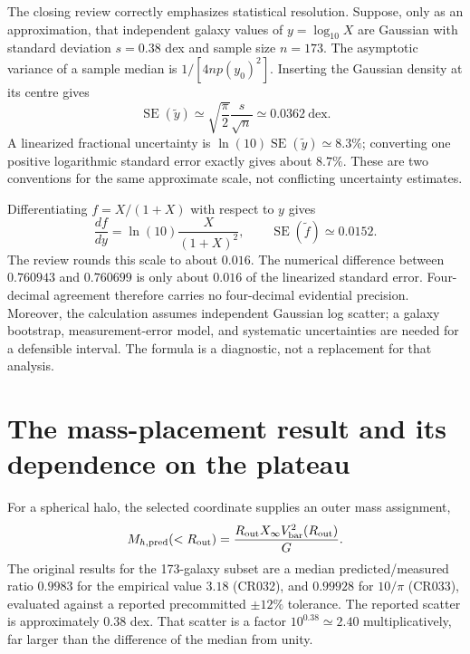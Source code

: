 The closing review correctly emphasizes statistical resolution. Suppose, only as an approximation, that independent galaxy values of $y=\log_{10}X$ are Gaussian with standard deviation $s=0.38$ dex and sample size $n=173$. The asymptotic variance of a sample median is $1/[4n p(y_0)^2]$. Inserting the Gaussian density at its centre gives
\begin{equation}
 \operatorname{SE}(\widetilde y)\simeq
 \sqrt{\frac{\pi}{2}}\frac{s}{\sqrt n}
 \simeq0.0362\ \mathrm{dex}.
 \label{c10:medianerror}
\end{equation}
A linearized fractional uncertainty is $\ln(10)\operatorname{SE}(\widetilde y)\simeq8.3\%$; converting one positive logarithmic standard error exactly gives about $8.7\%$. These are two conventions for the same approximate scale, not conflicting uncertainty estimates.

Differentiating $f=X/(1+X)$ with respect to $y$ gives
\begin{equation}
 \frac{df}{dy}=\ln(10)\frac{X}{(1+X)^2},\qquad
 \operatorname{SE}(\widetilde f)\simeq0.0152.
 \label{c10:ferror}
\end{equation}
The review rounds this scale to about $0.016$. The numerical difference between $0.760943$ and $0.760699$ is only about $0.016$ of the linearized standard error. Four-decimal agreement therefore carries no four-decimal evidential precision. Moreover, the calculation assumes independent Gaussian log scatter; a galaxy bootstrap, measurement-error model, and systematic uncertainties are needed for a defensible interval. The formula is a diagnostic, not a replacement for that analysis.

\section{The mass-placement result and its dependence on the plateau}

For a spherical halo, the selected coordinate supplies an outer mass assignment,
\begin{equation}
 M_{h,{\rm pred}}(<R_{\rm out})=
 \frac{R_{\rm out}X_\infty V_{\rm bar}^2(R_{\rm out})}{G}.
 \label{c10:massplacement}
\end{equation}
The original results for the 173-galaxy subset are a median predicted/measured ratio $0.9983$ for the empirical value $3.18$ (CR032), and $0.99928$ for $10/\pi$ (CR033), evaluated against a reported precommitted $\pm12\%$ tolerance. The reported scatter is approximately $0.38$ dex. That scatter is a factor $10^{0.38}\simeq2.40$ multiplicatively, far larger than the difference of the median from unity.

